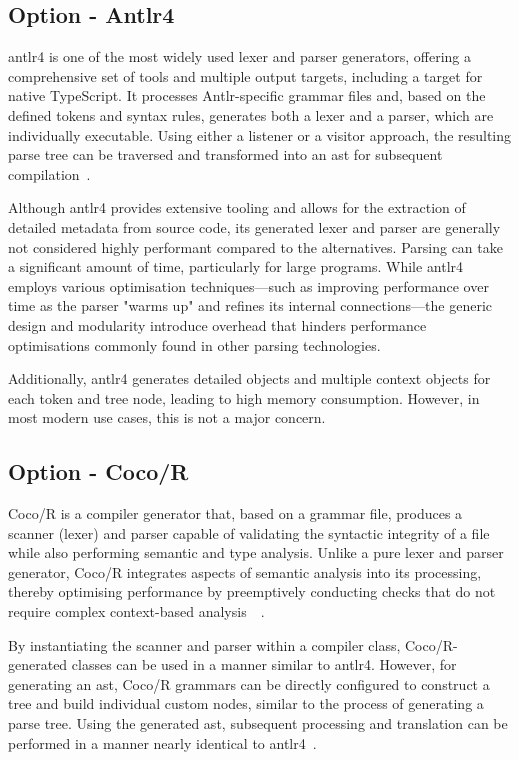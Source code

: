 \subsection{Option - Antlr4}

\Gls{antlr4} is one of the most widely used lexer and parser generators, offering a comprehensive set of tools and multiple output targets, including a target for native TypeScript. It processes Antlr-specific grammar files and, based on the defined tokens and syntax rules, generates both a lexer and a parser, which are individually executable. Using either a listener or a visitor approach, the resulting parse tree can be traversed and transformed into an \acrshort{ast} for subsequent compilation~\cite{antlr}.

Although \Gls{antlr4} provides extensive tooling and allows for the extraction of detailed metadata from source code, its generated lexer and parser are generally not considered highly performant compared to the alternatives. Parsing can take a significant amount of time, particularly for large programs. While \Gls{antlr4} employs various optimisation techniques—such as improving performance over time as the parser "warms up" and refines its internal connections—the generic design and modularity introduce overhead that hinders performance optimisations commonly found in other parsing technologies.

Additionally, \Gls{antlr4} generates detailed objects and multiple context objects for each token and tree node, leading to high memory consumption. However, in most modern use cases, this is not a major concern.

\subsection{Option - Coco/R}

Coco/R is a compiler generator that, based on a grammar file, produces a scanner (lexer) and parser capable of validating the syntactic integrity of a file while also performing semantic and type analysis. Unlike a pure lexer and parser generator, Coco/R integrates aspects of semantic analysis into its processing, thereby optimising performance by preemptively conducting checks that do not require complex context-based analysis~\cite{coco}~\cite{coco-manual}.

By instantiating the scanner and parser within a compiler class, Coco/R-generated classes can be used in a manner similar to \Gls{antlr4}. However, for generating an \acrshort{ast}, Coco/R grammars can be directly configured to construct a tree and build individual custom nodes, similar to the process of generating a parse tree. Using the generated \acrshort{ast}, subsequent processing and translation can be performed in a manner nearly identical to \Gls{antlr4}~\cite{coco-ast}.

